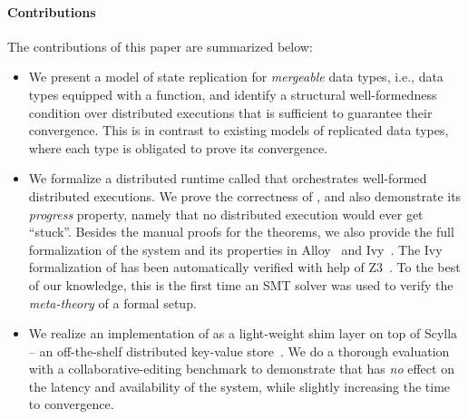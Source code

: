 \paragraph{Contributions} The contributions of this paper are summarized
below:
\begin{itemize}
  \item We present a model of state replication for \emph{mergeable} data
  types, i.e., data types equipped with a  function, and identify a
  structural well-formedness condition over distributed executions that is
  sufficient to guarantee their convergence. This is in contrast to
  existing models of replicated data types, where each type is obligated to
  prove its convergence.

  \item We formalize a distributed runtime called \quark that orchestrates
  well-formed distributed executions. We prove the correctness of \quark,
  and also demonstrate its \emph{progress} property, namely that no
  distributed execution would ever get ``stuck''. Besides the manual proofs
  for the theorems, we also provide the full formalization of the \quark
  system and its properties in Alloy~\cite{alloy} and Ivy~\cite{ivy}. The
  Ivy formalization of \quark has been automatically verified with help of
  Z3~\cite{z3}. To the best of our knowledge, this is the first time an SMT
  solver was used to verify the \emph{meta-theory} of a formal setup.

  \item We realize an implementation of \quark as a light-weight shim layer
  on top of Scylla -- an off-the-shelf distributed key-value
  store~\cite{scylla}. We do a thorough evaluation with a
    collaborative-editing benchmark to demonstrate that \quark has
    \emph{no} effect on the latency and availability of the system, while
    slightly increasing the time to convergence.
\end{itemize}

